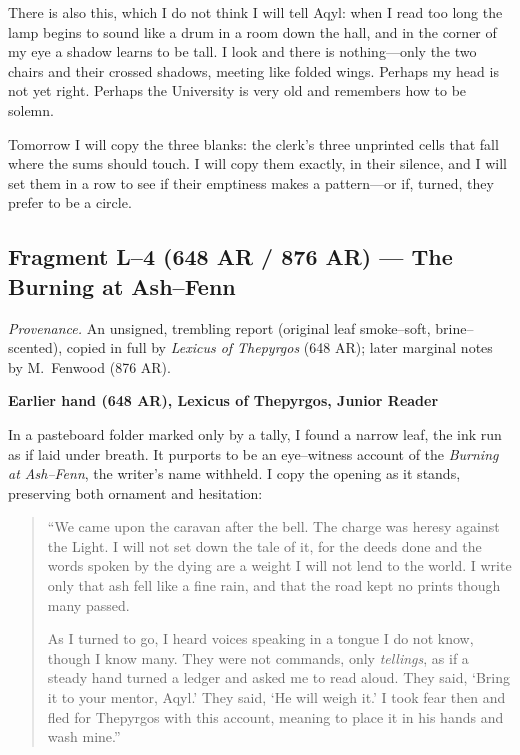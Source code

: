 \documentclass[11pt]{article}
\begin{document}
There is also this, which I do not think I will tell Aqyl: when I read too long the lamp begins to sound like a drum in a room down the hall, and in the corner of my eye a shadow learns to be tall. I look and there is nothing—only the two chairs and their crossed shadows, meeting like folded wings. Perhaps my head is not yet right. Perhaps the University is very old and remembers how to be solemn.

Tomorrow I will copy the three blanks: the clerk’s three unprinted cells that fall where the sums should touch. I will copy them exactly, in their silence, and I will set them in a row to see if their emptiness makes a pattern—or if, turned, they prefer to be a circle.

\subsection{Fragment L--4 (648 AR / 876 AR) — The Burning at Ash–Fenn}
\label{frag:l4}

\noindent\textit{Provenance.} An unsigned, trembling report (original leaf smoke–soft, brine–scented), copied in full by \textit{Lexicus of Thepyrgos} (648 AR); later marginal notes by M.\ Fenwood (876 AR).

\medskip
\noindent\textbf{Earlier hand (648 AR), Lexicus of Thepyrgos, Junior Reader}

In a pasteboard folder marked only by a tally, I found a narrow leaf, the ink run as if laid under breath. It purports to be an eye–witness account of the \textit{Burning at Ash–Fenn}, the writer’s name withheld. I copy the opening as it stands, preserving both ornament and hesitation:

\begin{quote}\small
“We came upon the caravan after the bell. The charge was heresy against the Light. I will not set down the tale of it, for the deeds done and the words spoken by the dying are a weight I will not lend to the world. I write only that ash fell like a fine rain, and that the road kept no prints though many passed.

As I turned to go, I heard voices speaking in a tongue I do not know, though I know many. They were not commands, only \emph{tellings}, as if a steady hand turned a ledger and asked me to read aloud. They said, ‘Bring it to your mentor, Aqyl.’ They said, ‘He will weigh it.’ I took fear then and fled for Thepyrgos with this account, meaning to place it in his hands and wash mine.”
\end{quote}
\end{document}
